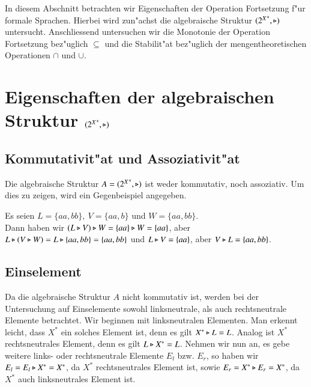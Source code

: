 In diesem Abschnitt betrachten wir Eigenschaften der Operation Fortsetzung f"ur formale Sprachen.
Hierbei wird zun"achst die algebraische Struktur $({2^X}^*,\triangleright)$ untersucht. Anschliessend untersuchen wir die Monotonie der Operation Fortsetzung bez"uglich $\subseteq$ und die Stabilit"at bez"uglich der mengentheoretischen Operationen $\cap$ und $\cup$.

\section{Eigenschaften der algebraischen Struktur $({2^X}^*,\triangleright)$}

\subsection{Kommutativit"at und Assoziativit"at}
Die algebraische Struktur $A=({2^X}^*,\triangleright)$ ist weder kommutativ, noch assoziativ. Um dies zu zeigen, wird ein Gegenbeispiel angegeben.

\vspace{2ex}

\begin{beispiel}
Es seien $L=\{aa,bb\},\ V = \{aa,b\}$ und $W=\{aa,bb\}$. \\Dann haben wir $(L\triangleright V)\triangleright W = \{aa\} \triangleright W = \{aa\}$, aber $L\triangleright (V\triangleright W) = L\triangleright \{aa,bb\} = \{aa,bb\}$ und $L\triangleright V = \{aa\}$, aber $V\triangleright L=\{aa,bb\}$.
\end{beispiel}

\subsection{Einselement}

Da die algebraische Struktur $A$ nicht kommutativ ist, werden bei der Untersuchung auf Einselemente sowohl linksneutrale, als auch rechtsneutrale Elemente betrachtet.
Wir beginnen mit linksneutralen Elementen.
Man erkennt leicht, dass $X^*$ ein solches Element ist, denn es gilt $X^*\triangleright L = L$.
Analog ist $X^*$ rechtsneutrales Element, denn es gilt $L\triangleright X^* = L$.
Nehmen wir nun an, es gebe weitere links- oder rechtsneutrale Elemente $E_l$ bzw. $E_r$, so haben wir $E_l=E_l\triangleright X^* = X^*$, da $X^*$ rechtsneutrales Element ist, sowie $E_r = X^*\triangleright E_r = X^*$, da $X^*$ auch linksneutrales Element ist.
